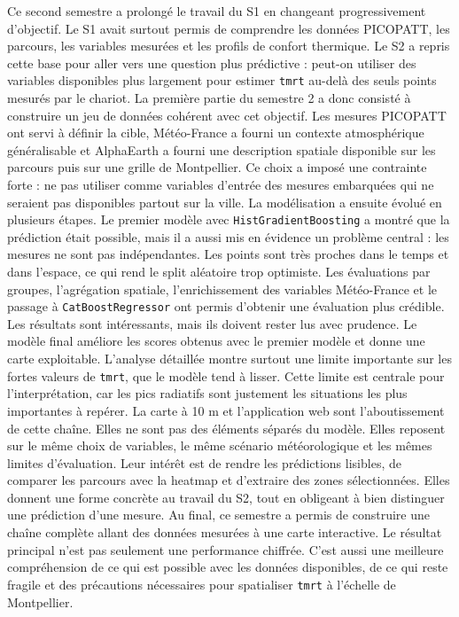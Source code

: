 \documentclass{article}
\begin{document}
Ce second semestre a prolongé le travail du S1 en changeant progressivement d'objectif. Le S1 avait surtout permis de comprendre les données PICOPATT, les parcours, les variables mesurées et les profils de confort thermique. Le S2 a repris cette base pour aller vers une question plus prédictive : peut-on utiliser des variables disponibles plus largement pour estimer \texttt{tmrt} au-delà des seuls points mesurés par le chariot.
La première partie du semestre 2 a donc consisté à construire un jeu de données cohérent avec cet objectif. Les mesures PICOPATT ont servi à définir la cible, Météo-France a fourni un contexte atmosphérique généralisable et AlphaEarth a fourni une description spatiale disponible sur les parcours puis sur une grille de Montpellier. Ce choix a imposé une contrainte forte : ne pas utiliser comme variables d'entrée des mesures embarquées qui ne seraient pas disponibles partout sur la ville.
La modélisation a ensuite évolué en plusieurs étapes. Le premier modèle avec \texttt{HistGradientBoosting} a montré que la prédiction était possible, mais il a aussi mis en évidence un problème central : les mesures ne sont pas indépendantes. Les points sont très proches dans le temps et dans l'espace, ce qui rend le split aléatoire trop optimiste. Les évaluations par groupes, l'agrégation spatiale, l'enrichissement des variables Météo-France et le passage à \texttt{CatBoostRegressor} ont permis d'obtenir une évaluation plus crédible.
Les résultats sont intéressants, mais ils doivent rester lus avec prudence. Le modèle final améliore les scores obtenus avec le premier modèle et donne une carte exploitable. L'analyse détaillée montre surtout une limite importante sur les fortes valeurs de \texttt{tmrt}, que le modèle tend à lisser. Cette limite est centrale pour l'interprétation, car les pics radiatifs sont justement les situations les plus importantes à repérer.
La carte à 10 m et l'application web sont l'aboutissement de cette chaîne. Elles ne sont pas des éléments séparés du modèle. Elles reposent sur le même choix de variables, le même scénario météorologique et les mêmes limites d'évaluation. Leur intérêt est de rendre les prédictions lisibles, de comparer les parcours avec la heatmap et d'extraire des zones sélectionnées. Elles donnent une forme concrète au travail du S2, tout en obligeant à bien distinguer une prédiction d'une mesure.
Au final, ce semestre a permis de construire une chaîne complète allant des données mesurées à une carte interactive. Le résultat principal n'est pas seulement une performance chiffrée. C'est aussi une meilleure compréhension de ce qui est possible avec les données disponibles, de ce qui reste fragile et des précautions nécessaires pour spatialiser \texttt{tmrt} à l'échelle de Montpellier.

\newpage
\printbibliography
\end{document}
